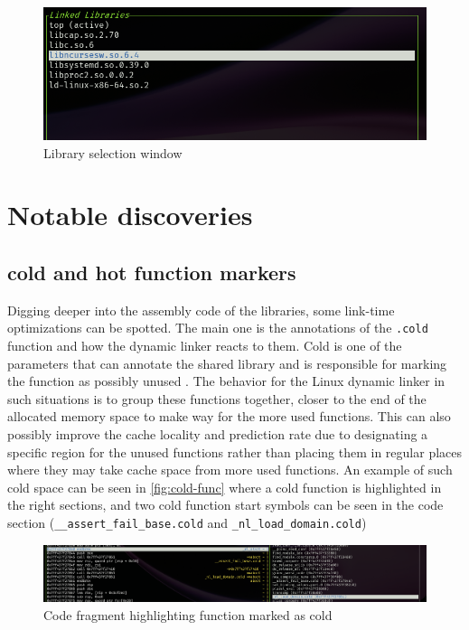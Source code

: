 \begin{figure}
    \centering
    \includegraphics[width=0.7\linewidth]{tui-lib-select.png}
    \caption{Library selection window}
    \label{fig:lib-select}
\end{figure}

\section{Notable discoveries}

\subsection{cold and hot function markers}

Digging deeper into the assembly code of the libraries, some link-time optimizations can be spotted.
The main one is the annotations of the \verb|.cold| function and how the dynamic linker reacts to them.
Cold is one of the parameters that can annotate the shared library and is responsible for marking the function as possibly unused \cite{noauthor_common_nodate}.
The behavior for the Linux dynamic linker in such situations is to group these functions together, closer to the end of the allocated memory space to make way for the more used functions.
This can also possibly improve the cache locality and prediction rate due to designating a specific region for the unused functions rather than placing them in regular places where they may take cache space from more used functions. 
An example of such cold space can be seen in \autoref{fig:cold-func} where a cold function is highlighted in the right sections, and two cold function start symbols can be seen in the code section (\verb|__assert_fail_base.cold| and \verb|_nl_load_domain.cold|)

\begin{figure}
    \centering
    \includegraphics[width=1\linewidth]{cold-starts.png}
    \caption{Code fragment highlighting function marked as cold}
    \label{fig:cold-func}
\end{figure}

